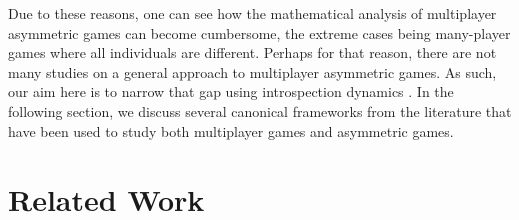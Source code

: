 \documentclass[11pt]{article}
\theoremstyle{plainCl1}
\theoremstyle{plainCl2}
\begin{document}
\noindent Due to these reasons, one can see how the mathematical analysis of multiplayer asymmetric games can become cumbersome, the extreme cases being many-player games where all individuals are different. Perhaps for that reason, there are not many studies on a general approach to multiplayer asymmetric games. As such, our aim here is to narrow that gap using introspection dynamics \cite{Couto:NJP:2022}. In the following section, we discuss several canonical frameworks from the literature that have been used to study both multiplayer games and asymmetric games.%


\section*{Related Work}

\end{document}
